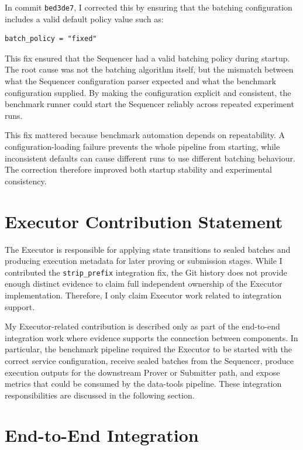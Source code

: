 In commit \texttt{bed3de7}, I corrected this by ensuring that the batching configuration includes a valid default policy value such as:

\begin{lstlisting}[basicstyle=\ttfamily\small]
batch_policy = "fixed"
\end{lstlisting}

This fix ensured that the Sequencer had a valid batching policy during startup. The root cause was not the batching algorithm itself, but the mismatch between what the Sequencer configuration parser expected and what the benchmark configuration supplied. By making the configuration explicit and consistent, the benchmark runner could start the Sequencer reliably across repeated experiment runs.

This fix mattered because benchmark automation depends on repeatability. A configuration-loading failure prevents the whole pipeline from starting, while inconsistent defaults can cause different runs to use different batching behaviour. The correction therefore improved both startup stability and experimental consistency.

\section{Executor Contribution Statement}

The Executor is responsible for applying state transitions to sealed batches and producing execution metadata for later proving or submission stages. While I contributed the \texttt{strip\_prefix} integration fix, the Git history does not provide enough distinct evidence to claim full independent ownership of the Executor implementation. Therefore, I only claim Executor work related to integration support.

My Executor-related contribution is described only as part of the end-to-end integration work where evidence supports the connection between components. In particular, the benchmark pipeline required the Executor to be started with the correct service configuration, receive sealed batches from the Sequencer, produce execution outputs for the downstream Prover or Submitter path, and expose metrics that could be consumed by the data-tools pipeline. These integration responsibilities are discussed in the following section.

\section{End-to-End Integration}

